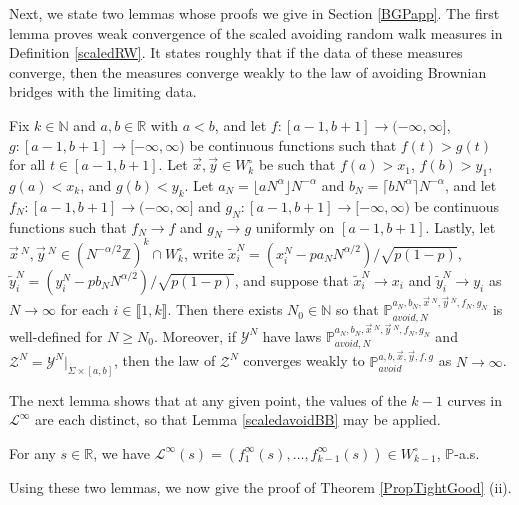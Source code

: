 Next, we state two lemmas whose proofs we give in Section \ref{BGPapp}. The first lemma proves weak convergence of the scaled avoiding random walk measures in Definition \ref{scaledRW}. It states roughly that if the data of these measures converge, then the measures converge weakly to the law of avoiding Brownian bridges with the limiting data.

\begin{lemma}\label{scaledavoidBB}
	Fix $k\in\mathbb{N}$ and $a,b\in\mathbb{R}$ with $a<b$, and let $f:[a-1,b+1]\to(-\infty,\infty]$, $g:[a-1,b+1]\to[-\infty,\infty)$ be continuous functions such that $f(t) > g(t)$ for all $t\in[a-1,b+1]$. Let $\vec{x},\vec{y}\in W_k^\circ$ be such that $f(a) > x_1$, $f(b) > y_1$, $g(a) < x_k$, and $g(b) < y_k$. Let $a_N = \lfloor aN^\alpha\rfloor N^{-\alpha}$ and $b_N = \lceil bN^\alpha\rceil N^{-\alpha}$, and let $f_N : [a-1,b+1]\to(-\infty,\infty]$ and $g_N : [a-1,b+1]\to[-\infty,\infty)$ be continuous functions such that $f_N\to f$ and $g_N\to g$ uniformly on $[a-1,b+1]$. Lastly, let $\vec{x}\,^N, \vec{y}\,^N \in (N^{-\alpha/2}\mathbb{Z})^k \cap W_k^\circ$, write $\tilde{x}^N_i = (x_i^N - pa_N N^{\alpha/2})/\sqrt{p(1-p)}$, $\tilde{y}^N_i = (y_i^N - pb_N N^{\alpha/2})/\sqrt{p(1-p)}$, and suppose that $\tilde{x}^N_i \to x_i$ and $\tilde{y}^N_i \to y_i$ as $N\to\infty$ for each $i\in\llbracket 1,k\rrbracket$. Then there exists $N_0 \in \mathbb{N}$ so that $\mathbb{P}^{a_N,b_N,\vec{x}\,^N,\vec{y}\,^N,f_N,g_N}_{avoid,N}$ is well-defined for $N\geq N_0$. Moreover, if $\mathcal{Y}^N$ have laws $\mathbb{P}^{a_N,b_N,\vec{x}\,^N,\vec{y}\,^N,f_N,g_N}_{avoid,N}$ and $\mathcal{Z}^N = \mathcal{Y}^N|_{\Sigma\times[a,b]}$, then the law of $\mathcal{Z}^N$ converges weakly to $\mathbb{P}^{a,b,\vec{x},\vec{y},f,g}_{avoid}$ as $N\to\infty$.
\end{lemma}

The next lemma shows that at any given point, the values of the $k-1$ curves in $\mathcal{L}^\infty$ are each distinct, so that Lemma \ref{scaledavoidBB} may be applied.

\begin{lemma}\label{inftydistinct}
	For any $s\in\mathbb{R}$, we have $\mathcal{L}^\infty(s) = (f_1^\infty(s),\dots,f_{k-1}^\infty(s)) \in W^\circ_{k-1}$, $\mathbb{P}$-a.s.
\end{lemma}

Using these two lemmas, we now give the proof of Theorem \ref{PropTightGood} (ii).

